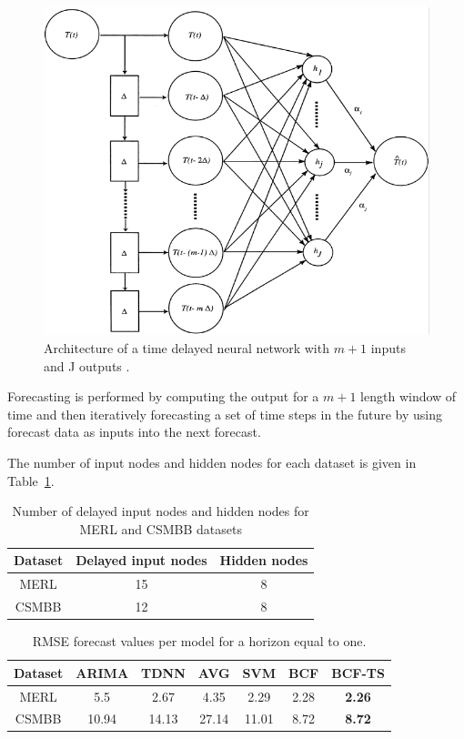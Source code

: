 \documentclass{acm_proc_article-sp}
\begin{document}
\begin{figure}[h]
\centering
\includegraphics[width = .8\linewidth]{time_delay_neural_network.png}
\caption{Architecture of a time delayed neural network with $m + 1$ inputs and J outputs \cite{Hansen2003}.}
\label{fig:tdnnarch}
\end{figure}

Forecasting is performed by computing the output for a $m + 1$ length window of time and then iteratively forecasting a set of time steps in the future by using forecast data as inputs into the next forecast. 

The number of input nodes and hidden nodes for each dataset is given in Table~\ref{fig:tdnntab}.

\begin{table}[h]
\centering
\caption{Number of delayed input nodes and hidden nodes for MERL and CSMBB datasets}
\begin{tabular}{|c|c|c|} \hline
Dataset & Delayed input nodes & Hidden nodes\\ \hline
MERL & 15 & 8\\ \hline
CSMBB & 12 & 8\\ \hline
\end{tabular}
\label{fig:tdnntab}
\end{table}


\begin{table}[t!]
\centering
\caption{RMSE forecast values per model for a horizon equal to one.}
\begin{tabular}{|c|c|c|c|c|c|c|} \hline
Dataset & ARIMA & TDNN & AVG & SVM & BCF & BCF-TS\\ \hline
MERL & 5.5 & 2.67 & 4.35 & 2.29 & 2.28 & \textbf{2.26}\\ \hline
CSMBB & 10.94 & 14.13 & 27.14 & 11.01 & 8.72 & \textbf{8.72}\\ \hline
\end{tabular}
\label{fig:rmsetab}
\end{table}
\end{document}
